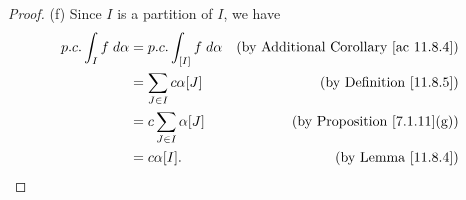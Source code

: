 \begin{proof}{(f)}
    Since \(I\) is a partition of \(I\), we have
    \begin{align*}
        p.c. \int_I f \; d \alpha & = p.c. \int_{[I]} f \; d \alpha & \text{(by Additional Corollary \ref{ac 11.8.4})} \\
                                  & = \sum_{J \in I} c \alpha[J]    & \text{(by Definition \ref{11.8.5})}              \\
                                  & = c \sum_{J \in I} \alpha[J]    & \text{(by Proposition \ref{7.1.11}(g))}          \\
                                  & = c \alpha[I].                  & \text{(by Lemma \ref{11.8.4})}
    \end{align*}
\end{proof}


